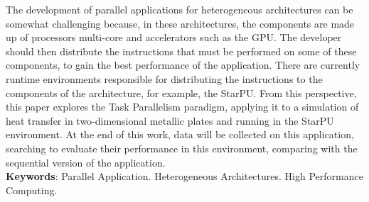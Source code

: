 
\begin{resumo}[ABSTRACT]
\begin{SingleSpacing}


The development of parallel applications for heterogeneous architectures can be somewhat challenging because,
in these architectures, the components are made up of processors multi-core and accelerators such as the GPU.
The developer should then distribute the instructions that must be performed on some of these components,
to gain the best performance of the application. There are currently runtime environments responsible
for distributing the instructions to the components of the architecture, for example, the StarPU.
From this perspective, this paper explores the Task Parallelism paradigm, applying it to a simulation of heat transfer in two-dimensional metallic plates and running in the StarPU  environment.
At the end of this work, data will be collected on this application,
searching to evaluate their performance in this environment, comparing with the sequential version of the application.\\

\textbf{Keywords}: Parallel Application. Heterogeneous Architectures. High Performance Computing.

\end{SingleSpacing}
\end{resumo}

